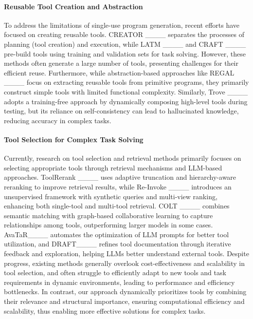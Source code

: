 \paragraph{Reusable Tool Creation and Abstraction} To address the limitations of single-use program generation, recent efforts have focused on creating reusable tools. CREATOR ____ separates the processes of planning (tool creation) and execution, while LATM ____ and CRAFT ____ pre-build tools using training and validation sets for task solving. However, these methods often generate a large number of tools, presenting challenges for their efficient reuse. Furthermore, while abstraction-based approaches like REGAL ____ focus on extracting reusable tools from primitive programs, they primarily construct simple tools with limited functional complexity. Similarly, Trove ____ adopts a training-free approach by dynamically composing high-level tools during testing, but its reliance on self-consistency can lead to hallucinated knowledge, reducing accuracy in complex tasks.

\paragraph{Tool Selection for Complex Task Solving} Currently, research on tool selection and retrieval methods primarily focuses on selecting appropriate tools through retrieval mechanisms and LLM-based approaches. ToolRerank ____ uses adaptive truncation and hierarchy-aware reranking to improve retrieval results, while Re-Invoke ____ introduces an unsupervised framework with synthetic queries and multi-view ranking, enhancing both single-tool and multi-tool retrieval. COLT ____ combines semantic matching with graph-based collaborative learning to capture relationships among tools, outperforming larger models in some cases. AvaTaR____ automates the optimization of LLM prompts for better tool utilization, and DRAFT____ refines tool documentation through iterative feedback and exploration, helping LLMs better understand external tools. Despite progress, existing methods generally overlook cost-effectiveness and scalability in tool selection, and often struggle to efficiently adapt to new tools and task requirements in dynamic environments, leading to performance and efficiency bottlenecks. In contrast, our approach dynamically prioritizes tools by combining their relevance and structural importance, ensuring computational efficiency and scalability, thus enabling more effective solutions for complex tasks.